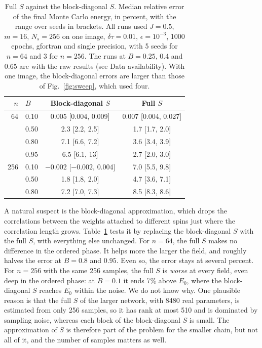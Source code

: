 \documentclass[aps,prb,preprint,amsmath,amssymb,nofootinbib,longbibliography]{revtex4-2}
\newcommand{\dtau}{\delta\tau}
\begin{document}
\begin{table}[b]
\caption{Full $S$ against the block-diagonal $S$. Median relative error of the final Monte Carlo energy, in percent,
with the range over seeds in brackets. All runs used $J = 0.5$, $m = 16$, $N_s = 256$ on one image, $\dtau = 0.01$,
$\epsilon = 10^{-3}$, 1000 epochs, gfortran and single precision, with 5 seeds for $n = 64$ and 3 for $n = 256$. The
runs at $B = 0.25$, 0.4 and 0.65 are with the raw results (see Data availability).
With one image, the block-diagonal errors are larger than those of Fig.~\ref{fig:sweep}, which used four.}
\label{tab:fullsr}
\begin{ruledtabular}
\begin{tabular}{rlcc}
$n$ & $B$ & Block-diagonal $S$ & Full $S$ \\
\hline
64 & 0.10 & 0.005 [0.004, 0.009] & 0.007 [0.004, 0.027] \\
   & 0.50 & 2.3 [2.2, 2.5] & 1.7 [1.7, 2.0] \\
   & 0.80 & 7.1 [6.6, 7.2] & 3.6 [3.4, 3.9] \\
   & 0.95 & 6.5 [6.1, 13] & 2.7 [2.0, 3.0] \\
256 & 0.10 & $-0.002$ [$-0.002$, 0.004] & 7.0 [5.5, 9.8] \\
   & 0.50 & 1.8 [1.8, 2.0] & 4.7 [3.6, 7.1] \\
   & 0.80 & 7.2 [7.0, 7.3] & 8.5 [8.3, 8.6] \\
\end{tabular}
\end{ruledtabular}
\end{table}

A natural suspect is the block-diagonal approximation, which drops the correlations between the weights attached to
different spins just where the correlation length grows. Table~\ref{tab:fullsr} tests it by replacing the
block-diagonal $S$ with the full $S$, with everything else unchanged. For $n = 64$, the full $S$ makes no difference
in the ordered phase. It helps more the larger the field, and roughly halves the error at $B = 0.8$ and $0.95$. Even
so, the error stays at several percent. For $n = 256$ with the same 256 samples, the full $S$ is \emph{worse} at
every field, even deep in the ordered phase: at $B = 0.1$ it ends 7\% above $E_0$, where the block-diagonal $S$
reaches $E_0$ within the noise. We do not know why. One plausible reason is
that the full $S$ of the larger network, with 8480 real parameters, is estimated from only 256 samples, so it has
rank at most 510 and is dominated by sampling noise, whereas each block of the block-diagonal $S$ is small. The
approximation of $S$ is therefore part of the problem for the smaller chain, but not all of it, and the number of
samples matters as well.
\end{document}
